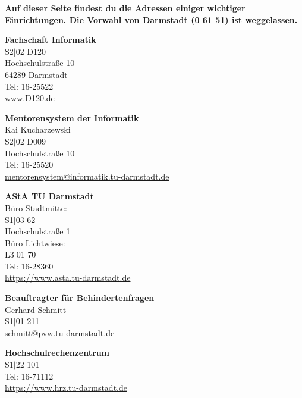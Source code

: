 
\textbf{Auf dieser Seite findest du die Adressen einiger wichtiger Einrichtungen. Die Vorwahl von Darmstadt (0 61 51) ist weggelassen.}

\begin{multicols}{2}

\textbf{Fachschaft Informatik}\\
S2$|$02 D120\\
Hochschulstraße 10\\
64289 Darmstadt\\
Tel: 16-25522\\
\url{www.D120.de}

\vspace{3mm}
\textbf{Mentorensystem der Informatik}\\
Kai Kucharzewski\\
S2$|$02 D009\\
Hochschulstraße 10\\
Tel: 16-25520\\
\href{mailto:mentorensystem@informatik.tu-darmstadt.de}{mentorensystem@informatik.tu-darmstadt.de}

\vspace{3mm}
\textbf{AStA TU Darmstadt}\\
Büro Stadtmitte:\\
S1$|$03 62\\
Hochschulstraße 1\\
Büro Lichtwiese:\\
L3$|$01 70\\
Tel: 16-28360\\
\url{https://www.asta.tu-darmstadt.de}

\vspace{3mm}
\textbf{Beauftragter für Behindertenfragen}\\
Gerhard Schmitt\\
S1$|$01 211\\
\href{mailto:schmitt@pvw.tu-darmstadt.de}{schmitt@pvw.tu-darmstadt.de}

\vspace{3mm}
\textbf{Hochschulrechenzentrum}\\
S1$|$22 101\\
Tel: 16-71112\\
\url{https://www.hrz.tu-darmstadt.de}


\


\end{multicols}
